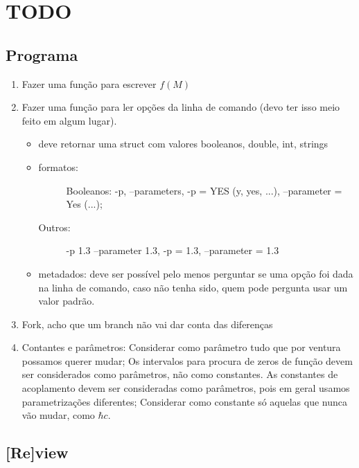 \chapter{TODO}

\section{Programa}

\begin{enumerate}
\item Fazer uma função para escrever $f(M)$

\item Fazer uma função para ler opções da linha de comando (devo ter isso meio feito em algum lugar).
	\begin{itemize}
	\item deve retornar uma struct com valores booleanos, double, int, strings
	\item
		\begin{description}
			\item[formatos:] Booleanos: -p, --parameters, -p = YES (y, yes, ...), --parameter = Yes (...);
			\item[Outros:] -p 1.3 --parameter 1.3, -p = 1.3, --parameter = 1.3
		\end{description}
	\item metadados: deve ser possível pelo menos perguntar se uma opção foi dada na linha de comando, caso não tenha sido, quem pode pergunta usar um valor padrão.
	\end{itemize}
\item Fork, acho que um branch não vai dar conta das diferenças
\item Contantes e parâmetros: Considerar como parâmetro tudo que por ventura possamos querer mudar; Os intervalos para procura de zeros de função devem ser considerados como parâmetros, não como constantes. As constantes de acoplamento devem ser consideradas como parâmetros, pois em geral usamos parametrizações diferentes; Considerar como constante só aquelas que nunca vão mudar, como $\hbar c$.
\end{enumerate}

\section{[Re]view}


